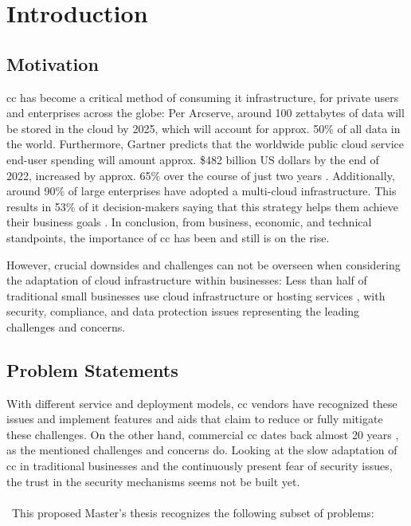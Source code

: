 
\chapter{Introduction}
\label{ch:intro}

	\section{Motivation} \label{sec:intro-motivation}
	
	\ac{cc} has become a critical method of consuming \ac{it} infrastructure, for private users and enterprises across the globe: Per Arcserve, around 100 zettabytes of data will be stored in the cloud by 2025, which will account for approx. 50\% of all data in the world. \cite{Morgan2020} Furthermore, Gartner predicts that the worldwide public cloud service end-user spending will amount approx. \$482 billion US dollars by the end of 2022, increased by approx. 65\% over the course of just two years \cite{Rimol2021}. Additionally, around 90\% of large enterprises have adopted a multi-cloud infrastructure. This results in 53\% of \ac{it} decision-makers saying that this strategy helps them achieve their business goals \cite{Forrester2022}. In conclusion, from business, economic, and technical standpoints, the importance of \ac{cc} has been and still is on the rise.
	
	However, crucial downsides and challenges can not be overseen when considering the adaptation of cloud infrastructure within businesses: Less than half of traditional small businesses use cloud infrastructure or hosting services \cite{DigitalOcean2021}, with security, compliance, and data protection issues representing the leading challenges and concerns. \cite{ISC22022}\cite{Flexera2021}
	
	
	\section{Problem Statements} \label{sec:intro-problems}
	
	With different service and deployment models, \ac{cc} vendors have recognized these issues and implement features and aids that claim to reduce or fully mitigate these challenges. On the other hand, commercial \ac{cc} dates back almost 20 years \cite{Qian2009}, as the mentioned challenges and concerns do. Looking at the slow adaptation of \ac{cc} in traditional businesses and the continuously present fear of security issues, the trust in the security mechanisms seems not be built yet. 
	\\\ \\\
	This proposed Master's thesis recognizes the following subset of problems:
	
